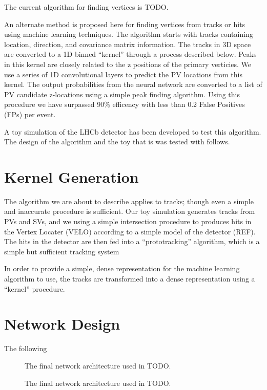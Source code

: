 \documentclass[a4paper]{jpconf}
\begin{document}
The current algorithm for finding vertices is TODO.

An alternate method is proposed here for finding vertices from tracks or hits using machine learning techniques. The algorithm starts with tracks containing location, direction, and covariance matrix information. The tracks in 3D space are converted to a 1D binned ``kernel'' through a process described below. Peaks in this kernel are closely related to the z positions of the primary verticies. We use a series of 1D convolutional layers to predict the PV locations from this kernel. The output probabilities from the neural network are converted to a list of PV candidate z-locations using a simple peak finding algorithm. Using this procedure we have surpassed 90\% efficency with less than 0.2 False Positives (FPs) per event.

A toy simulation of the LHCb detector has been developed to test this algorithm. The design of the algorithm and the toy that is was tested with follows.

\section{Kernel Generation}

The algorithm we are about to describe applies to tracks; though even a simple and inaccurate procedure is sufficient. Our toy simulation generates tracks from PVs and SVs, and we using a simple intersection procedure to produces hits in the Vertex Locater (VELO) according to a simple model of the detector (REF). The hits in the detector are then fed into a ``prototracking'' algorithm, which is a simple but sufficient tracking system 

In order to provide a simple, dense representation for the machine learning algorithm to use, the tracks are transformed into a dense representation using a ``kernel'' procedure. 

\section{Network Design}

The following 

\begin{figure}
   \centering
   
   \caption{The final network architecture used in TODO.}
   \label{fig:nnarch}
\end{figure}

\begin{figure}
  \centering
  
  \caption{The final network architecture used in TODO.}
  \label{fig:approach}
\end{figure}
\end{document}
